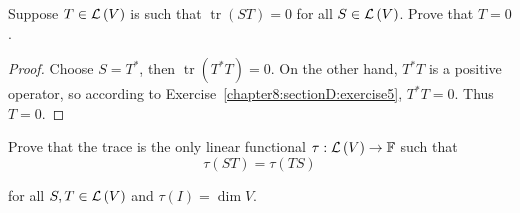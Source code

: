 \begin{exercise}\label{chapter8:sectionD:exercise9}
    Suppose $T\in\mathcal{L}\left({V}\right)$ is such that $\operatorname{tr}(ST) = 0$ for all $S\in\mathcal{L}\left({V}\right)$. Prove that $T = 0$.
\end{exercise}

\begin{proof}
    Choose $S = T^{*}$, then $\operatorname{tr}(T^{*}T) = 0$. On the other hand, $T^{*}T$ is a positive operator, so according to Exercise~\ref{chapter8:sectionD:exercise5}, $T^{*}T = 0$. Thus $T = 0$.
\end{proof}
\newpage

\begin{exercise}\label{chapter8:sectionD:exercise10}
    Prove that the trace is the only linear functional $\tau: \mathcal{L}\left({V}\right)\to\mathbb{F}$ such that
    \[
        \tau(ST) = \tau(TS)
    \]

    for all $S, T\in\mathcal{L}\left({V}\right)$ and $\tau(I) = \dim V$.
\end{exercise}

